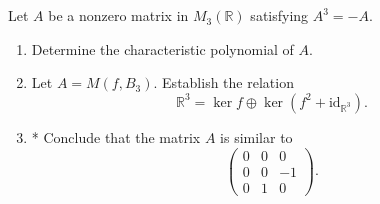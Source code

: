 \documentclass[12pt]{article}
\begin{document}
\section{}

Let $A$ be a nonzero matrix in $M_3(\mathbb{R})$ satisfying $A^3 = -A$.

\begin{enumerate}
    \item[1)] Determine the characteristic polynomial of $A$.
    \item[2)] Let $A = M(f, B_3)$. Establish the relation
    \[
    \mathbb{R}^3 = \ker f \oplus \ker(f^2 + \mathrm{id}_{\mathbb{R}^3}).
    \]
    \item[3)]* Conclude that the matrix $A$ is similar to
    \[
    \begin{pmatrix}
    0 & 0 & 0\\
    0 & 0 & -1\\
    0 & 1 & 0
    \end{pmatrix}.
    \]
\end{enumerate}
\end{document}
